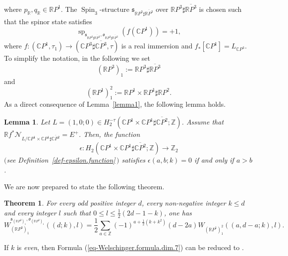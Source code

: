 \documentclass[11pt]{amsart}
\numberwithin{equation}{section}
\theoremstyle{definition}
\theoremstyle{plain}
\newtheorem{theorem}[definition]{Theorem}
\newtheorem{lemma}[definition]{Lemma}
\theoremstyle{remark}
\newcommand{\R}{\mathbb{R}}
\newcommand{\Z}{\mathbb{Z}}
\newcommand{\C}{\mathbb{C}}
\newcommand{\cpp}{\mathbb{C}P^3}
\newcommand{\pp}{\mathbb{C}P^1\times \mathbb{C}P^1}
\DeclareMathOperator{\Spin}{Spin}
\renewcommand{\sp}{\operatorname{sp}}
\newcommand{\lra}{\longrightarrow}
\begin{document}
where $p_\R , q_\R \in \R P^1$. The $\Spin_3$-structure $\mathfrak{s}_{\R P^3\sharp \overline{\R P^3}}$ over $\R P^3\sharp \overline{\R P^3}$ is chosen such that the spinor state satisfies 
$$\sp_{\mathfrak{s}_{\R P^3\sharp \overline{\R P^3}},\mathfrak{o}_{\R P^3\sharp \overline{\R P^3}}}\left(f(\C P^1)\right)=+1,
$$
where $f\colon  (\C P^1,\tau_1) \to (\cpp\sharp\overline{\cpp},\tau)$ is a real immersion and $f_*[\C P^1]=L_{\C P^3}$. 
To simplify the notation, in the following we set  
$$(\R P^3)_1:=\R P^3\sharp \overline{\R P^3}$$ 
and 
$$(\R P^1)^2_1:=\R P^1\times \R P^1 \sharp {\R P^2}.$$
As a direct consequence of Lemma~\ref{lemma1}, the following lemma holds.

\begin{lemma} 
Let  $L= (1,0;0)\in H_2^{-\tau}(\pp\sharp\overline{\C P^2};\Z)$. Assume that $\R f^*\mathcal{N}_{L/\pp\sharp \overline{\C P^2}}=E^+$.
Then, the function
$$\epsilon\colon  H_2\left(\pp\sharp \overline{\C P^2};\Z\right)\lra \Z_2$$
$($see Definition~\ref{def-epsilon.function}\,$)$ satisfies
$\epsilon(a,b;k)=0$ if and only if $a>b$.
\end{lemma}

We are now prepared to state the following theorem.

\begin{theorem} \label{Theorem-W.in.deg.7}
 For every odd positive integer $d$, every non-negative integer $k \leq d$ and every integer $l$ such that $0\leq l \leq \frac{1}{2}(2d-1-k)$, one has
\begin{equation}
    \label{eq-Welschinger.formula.dim.7}
    W_{(\R P^3)_1}^{\mathfrak{s}_{(\R P^3)_1},\mathfrak{o}_{(\R P^3)_1}}((d;k),l)=\frac{1}{2}\sum_{a\in \Z}(-1)^{a+\frac{1}{2}(k+k^2)} (d-2a) W_{(\R P^1)^2_1} ((a,d-a;k),l).
\end{equation}
\end{theorem}
If $k$ is \textit{even}, then Formula (\ref{eq-Welschinger.formula.dim.7}) can be reduced to \cite[Theorem 1.1]{ding2020remark}.
\end{document}
